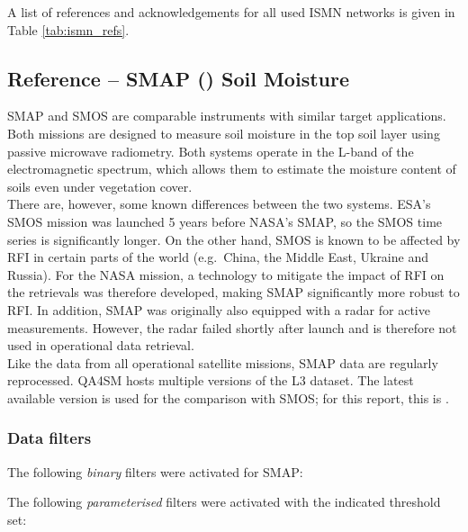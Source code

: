 \noindent A list of references and acknowledgements for all used \ac{ISMN} networks is given in Table \ref{tab:ismn_refs}.


\subsection{Reference -- SMAP () Soil Moisture} \label{ssec:smap}

\noindent \ac{SMAP} and \ac{SMOS} are comparable instruments with similar target applications. Both missions
are designed to measure soil moisture in the top soil layer using passive microwave radiometry.
Both systems operate in the L-band of the electromagnetic spectrum, which allows them to
estimate the moisture content of soils even under vegetation cover.
\\[1em]
There are, however, some known differences between the two systems. \ac{ESA}'s \ac{SMOS} mission was launched
5 years before \ac{NASA}'s \ac{SMAP}, so the \ac{SMOS} time series is significantly longer. On the other hand, \ac{SMOS}
is known to be affected by \ac{RFI} in certain parts of the world (e.g.\ China, the Middle East, Ukraine and Russia).
For the \ac{NASA} mission, a technology to mitigate the impact of \ac{RFI} on the retrievals was therefore developed, making
\ac{SMAP} significantly more robust to \ac{RFI}. In addition, \ac{SMAP} was originally also equipped with a radar for active measurements.
However, the radar failed shortly after launch and is therefore not used in operational data retrieval.
\\[1em]
Like the data from all operational satellite missions, \ac{SMAP} data are regularly reprocessed. \ac{QA4SM} hosts multiple versions of the \ac{L3} dataset.
The latest available version is used for the comparison with \ac{SMOS}; for this report, this is .

\subsubsection{Data filters}

\noindent The following \textit{binary} filters were activated for \ac{SMAP}:
\begin{itemize}
\end{itemize}
\vspace{1em}
\noindent The following \textit{parameterised} filters were activated with the indicated threshold set:
\begin{itemize}
\end{itemize}